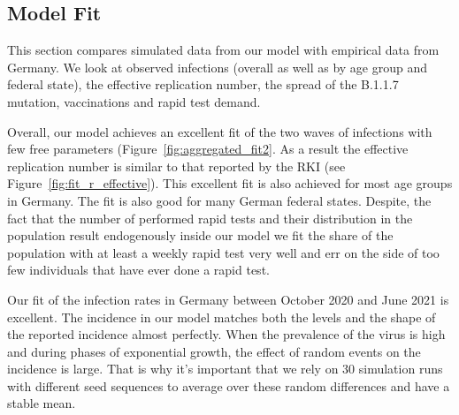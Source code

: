 \subsection{Model Fit}
\label{subsec:fit_results}

This section compares simulated data from our model with empirical data from Germany. We
look at observed infections (overall as well as by age group and federal state), the
effective replication number,  the spread of the B.1.1.7 mutation,
vaccinations and rapid test demand.

Overall, our model achieves an excellent fit of the two waves of infections with few free
parameters (Figure~\ref{fig:aggregated_fit2}. As a result the effective replication
number is similar to that reported by the RKI (see Figure~\ref{fig:fit_r_effective}).
This excellent fit is also achieved for most age groups in Germany. The fit is also good
for many German federal states. Despite, the fact that the number of performed rapid
tests and their distribution in the population result endogenously inside our model we
fit the share of the population with at least a weekly rapid test very well and err on
the side of too few individuals that have ever done a rapid test.

Our fit of the infection rates in Germany between October 2020 and June 2021 is
excellent. The incidence in our model matches both the levels and the shape of the
reported incidence almost perfectly. When the prevalence of the virus is high and during
phases of exponential growth, the effect of random events on the incidence is large. That
is why it's important that we rely on 30 simulation runs with different seed sequences to
average over these random differences and have a stable mean.

